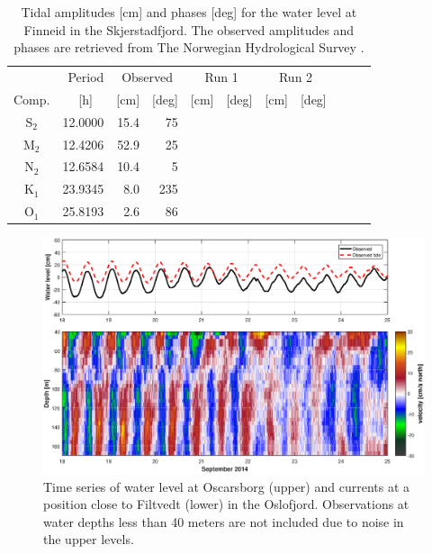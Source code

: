 \begin{table}[ht]
\caption{Tidal amplitudes [cm] and phases [deg] for the water level at Finneid in the Skjerstadfjord. The observed amplitudes and phases are retrieved from The Norwegian Hydrological Survey \cite[]{tide16}.}
\label{tab:Finneid}
\centering
\begin{tabular}{crrrrrrrrrr} \hline
      & Period & \multicolumn{2}{c}{Observed} & \multicolumn{2}{c}{Run 1} & \multicolumn{2}{c}{Run 2}  \\
Comp. & [h] $\;\;$ & [cm] & [deg] & [cm] & [deg] & [cm] & [deg]  \\ \hline 
S$_2$  & 12.0000 & 15.4 &  75  &    &   &   &   \\
M$_2$  & 12.4206 & 52.9 &  25  &    &   &   &   \\
N$_2$  & 12.6584 & 10.4 &   5  &    &   &   &   \\
K$_1$  & 23.9345 &  8.0 & 235  &    &   &   &   \\
O$_1$  & 25.8193 &  2.6 &  86  &    &   &   &   \\ \hline 
\end{tabular}
\end{table}

\begin{figure}[!t]
\centering
\includegraphics[width=\textwidth]{fig_Filtvedt_timeseries_obs}
\caption{Time series of water level at Oscarsborg (upper) and currents at a position close to Filtvedt (lower) in the Oslofjord. Observations at water depths less than 40 meters are not included due to noise in the upper levels.}
\label{fig:Filtvedt_timeseries_obs}
\end{figure}


